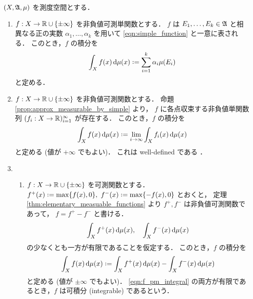 \begin{definition}\label{def:Lebesgue_integral}
    $(X,\mathfrak{A},\mu)$ を測度空間とする．
    \begin{enumerate}
        \item $f:X\to\mathbb{R}\cup\{\pm\infty\}$ を非負値可測単関数とする．
            $f$ は $E_1,\ldots,E_k\in\mathfrak{A}$ と相異なる正の実数 $\alpha_1,\ldots,\alpha_k$ を用いて
            \eqref{eqn:simple_function} と一意に表される．
            このとき，$f$ の積分を
            \begin{align*}
                \int_Xf(x)\,\drm\mu(x)\defeq\sum_{i=1}^k\alpha_i\mu(E_i)
            \end{align*}
            と定める．
        \item $f:X\to\mathbb{R}\cup\{\pm\infty\}$ を非負値可測関数とする．
            命題 \ref{prop:approx_measurable_by_simple} より，
            $f$ に各点収束する非負値単関数列 $(f_i:X\to\mathbb{R})_{i=1}^\infty$ が存在する．
            このとき，$f$ の積分を
            \begin{align*}
                \int_Xf(x)\,\drm\mu(x)\defeq\lim_{i\to\infty}\int_Xf_i(x)\,\drm\mu(x)
            \end{align*}
            と定める (値が $+\infty$ でもよい)．
            これは well-defined である \cite[pp.74--77]{It63}．
        \item
            \begin{enumerate}
                \item
                    $f:X\to\mathbb{R}\cup\{\pm\infty\}$ を可測関数とする．
                    $f^+(x)\defeq\max\{f(x),0\},\ f^-(x)\defeq\max\{-f(x),0\}$ とおくと，
                    定理 \ref{thm:elementary_measuable_functions} より $f^+,f^-$ は非負値可測関数であって，
                    $f=f^+-f^-$ と書ける．
                    \begin{align}
                        \int_Xf^+(x)\,\mathrm{d}\mu(x),\quad
                        \int_Xf^-(x)\,\mathrm{d}\mu(x)
                        \label{eqn:f_pm_integral}
                    \end{align}
                    の少なくとも一方が有限であることを仮定する．
                    このとき，$f$ の積分を
                    \begin{align*}
                        \int_Xf(x)\,\drm\mu(x)\defeq\int_Xf^+(x)\,\drm\mu(x)-\int_Xf^-(x)\,\drm\mu(x)
                    \end{align*}
                    と定める (値が $\pm\infty$ でもよい)．
                    \eqref{eqn:f_pm_integral} の両方が有限であるとき，$f$ は可積分 (integrable) であるという．

\end{enumerate}
\end{enumerate}
\end{definition}
